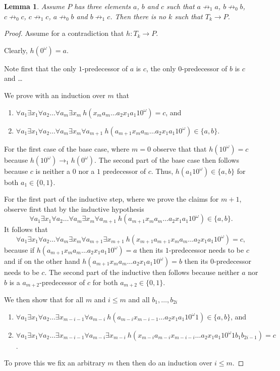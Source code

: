 \documentclass[a4paper]{article}
\newtheorem{lemma}[theorem]{Lemma}
\begin{document}
\begin{lemma} \label{first killer lemma}
 Assume $P$ has three elements $a$, $b$ and $c$ such that $a \not
\rightarrow_1 a$, $b \not \rightarrow_0 b$, $c \not \rightarrow_0 c$,
$c \not \rightarrow_1 c$, $a \not \rightarrow_0 b$ and $b \not
\rightarrow_1 c$. Then there is no $k$ such that $T_k \to P$.
\end{lemma}
\begin{proof}
 Assume for a contradiction that $h : T_k \to P$.

Clearly, $h(0^\omega) = a$.

Note first that the only $1$-predecessor of $a$ is $c$, the only
$0$-predecessor of $b$ is $c$ and \dots

We prove with an induction over $m$ that
\begin{enumerate}
 \item \label{even item} $\forall a_1 \exists x_1 \forall a_2 \dots
\forall a_m \exists x_m \  h(x_m a_m \dots a_2 x_1 a_1 1 0^\omega) = c$,
and
 \item \label{odd item} $\forall a_1 \exists x_1 \forall a_2 \dots
\forall a_m \exists x_m \forall a_{m + 1} \  h(a_{m + 1} x_m a_m \dots
a_2 x_1 a_1 1 0^\omega) \in \{a, b\}$.
\end{enumerate}
For the first case of the base case, where $m = 0$ observe that that
$h(10^\omega) = c$ because $h(10^\omega) \rightarrow_1 h(0^\omega)$. The
second part of the base case then follows because $c$ is neither a $0$
nor a $1$ predecessor of $c$. Thus, $h(a_1 1 0^\omega) \in \{a, b\}$ for
both $a_1 \in \{0,1\}$.

For the first part of the inductive step, where we prove the claims for
$m + 1$, observe first that by the inductive hypothesis
\[
 \forall a_1 \exists x_1 \forall a_2 \dots \forall a_m \exists x_m
\forall a_{m + 1} \  h(a_{m + 1} x_m a_m \dots a_2 x_1 a_1 1 0^\omega)
\in \{a, b\}.
\]
It follows that
\[
 \forall a_1 \exists x_1 \forall a_2 \dots \forall a_m \exists x_m
\forall a_{m + 1} \exists x_{m + 1} \  h(x_{m + 1} a_{m + 1} x_m a_m
\dots a_2 x_1 a_1 1 0^\omega) = c,
\]
because if $h(a_{m + 1} x_m a_m \dots a_2 x_1 a_1 1 0^\omega) = a$ then
its $1$-predecessor needs to be $c$ and if on the other hand $h(a_{m +
1} x_m a_m \dots a_2 x_1 a_1 1 0^\omega) = b$ then its $0$-predecessor
needs to be $c$. The second part of the inductive then follows because
neither $a$ nor $b$ is a $a_{m + 2}$-predecessor of $c$ for both $a_{m +
2} \in \{0,1\}$.

We then show that for all $m$ and $i \leq m$ and all $b_1,\dots,b_{2i}$
\begin{enumerate}
 \item \label{second power item} $\forall a_1 \exists x_1 \forall a_2
\dots \exists x_{m - i - 1} \forall a_{m - i} \  h(a_{m - i} x_{m - i - 1} \dots
a_2 x_1 a_1 1 0^\omega 1) \in \{a,b\}$, and
 \item \label{first power item} $\forall a_1 \exists x_1 \forall a_2
\dots \exists x_{m - i - 1} \forall a_{m - i} \exists x_{m - i} \
h(x_{m - i} a_{m - i} x_{m - i - i} \dots
a_2 x_1 a_1 1 0^\omega 1 b_1 b_{2i - 1}) = c$.
\end{enumerate}
To prove this we fix an arbitrary $m$ then then do an induction over $i
\leq m$.



\end{proof}
\end{document}
